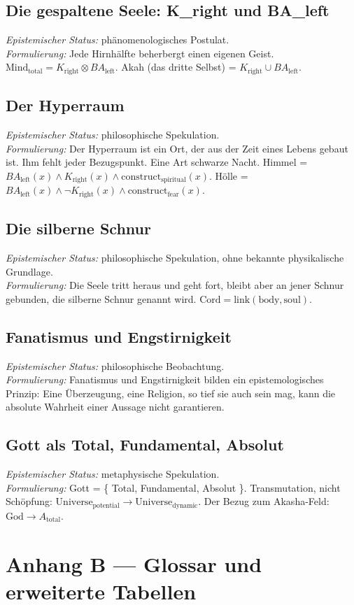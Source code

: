 \subsection{Die gespaltene Seele: K\_right und BA\_left}
\textit{Epistemischer Status:} phänomenologisches Postulat. \\
\textit{Formulierung:} Jede Hirnhälfte beherbergt einen eigenen Geist. $\text{Mind}_{\text{total}} = K_{\text{right}} \otimes BA_{\text{left}}$. Akah (das dritte Selbst) = $K_{\text{right}} \cup BA_{\text{left}}$.

\subsection{Der Hyperraum}
\textit{Epistemischer Status:} philosophische Spekulation. \\
\textit{Formulierung:} Der Hyperraum ist ein Ort, der aus der Zeit eines Lebens gebaut ist. Ihm fehlt jeder Bezugspunkt. Eine Art schwarze Nacht. Himmel = $BA_{\text{left}}(x) \land K_{\text{right}}(x) \land \text{construct}_{\text{spiritual}}(x)$. Hölle = $BA_{\text{left}}(x) \land \neg K_{\text{right}}(x) \land \text{construct}_{\text{fear}}(x)$.

\subsection{Die silberne Schnur}
\textit{Epistemischer Status:} philosophische Spekulation, ohne bekannte physikalische Grundlage. \\
\textit{Formulierung:} Die Seele tritt heraus und geht fort, bleibt aber an jener Schnur gebunden, die silberne Schnur genannt wird. $\text{Cord} = \text{link}(\text{body}, \text{soul})$.

\subsection{Fanatismus und Engstirnigkeit}
\textit{Epistemischer Status:} philosophische Beobachtung. \\
\textit{Formulierung:} Fanatismus und Engstirnigkeit bilden ein epistemologisches Prinzip: Eine Überzeugung, eine Religion, so tief sie auch sein mag, kann die absolute Wahrheit einer Aussage nicht garantieren.

\subsection{Gott als Total, Fundamental, Absolut}
\textit{Epistemischer Status:} metaphysische Spekulation. \\
\textit{Formulierung:} Gott = \{ Total, Fundamental, Absolut \}. Transmutation, nicht Schöpfung: $\text{Universe}_{\text{potential}} \to \text{Universe}_{\text{dynamic}}$. Der Bezug zum Akasha-Feld: $\text{God} \to A_{\text{total}}$.

\section{Anhang B --- Glossar und erweiterte Tabellen}
